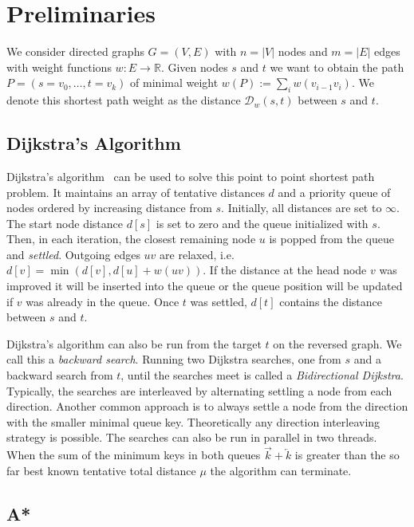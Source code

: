 \documentclass[manuscript,review]{acmart}
\newcommand*{\dist}{\mathcal{D}}
\begin{document}
\section{Preliminaries}\label{sec:preliminaries}

We consider directed graphs $G=(V,E)$ with $n=|V|$ nodes and $m=|E|$ edges with weight functions $w : E \to \mathbb{R}$.
Given nodes $s$ and $t$ we want to obtain the path $P=(s=v_0,\dots,t=v_k)$ of minimal weight $w(P) := \sum_{i} w(v_{i-1}v_i)$.
We denote this shortest path weight as the distance $\dist_w(s,t)$ between $s$ and $t$.

\subsection{Dijkstra's Algorithm}

Dijkstra's algorithm~\cite{d-ntpcg-59} can be used to solve this point to point shortest path problem.
It maintains an array of tentative distances $d$ and a priority queue of nodes ordered by increasing distance from $s$.
Initially, all distances are set to $\infty$.
The start node distance $d[s]$ is set to zero and the queue initialized with $s$.
Then, in each iteration, the closest remaining node $u$ is popped from the queue and \emph{settled}.
Outgoing edges $uv$ are relaxed, i.e. $d[v] = \min(d[v], d[u] + w(uv))$.
If the distance at the head node $v$ was improved it will be inserted into the queue or the queue position will be updated if $v$ was already in the queue.
Once $t$ was settled, $d[t]$ contains the distance between $s$ and $t$.

Dijkstra's algorithm can also be run from the target $t$ on the reversed graph.
We call this a \emph{backward search}.
Running two Dijkstra searches, one from $s$ and a backward search from $t$, until the searches meet is called a \emph{Bidirectional Dijkstra}.
Typically, the searches are interleaved by alternating settling a node from each direction.
Another common approach is to always settle a node from the direction with the smaller minimal queue key.
Theoretically any direction interleaving strategy is possible.
The searches can also be run in parallel in two threads.
When the sum of the minimum keys in both queues $\overrightarrow{k} + \overleftarrow{k}$ is greater than the so far best known tentative total distance $\mu$ the algorithm can terminate.

\subsection{A*}\label{sec:a_star}
\end{document}
